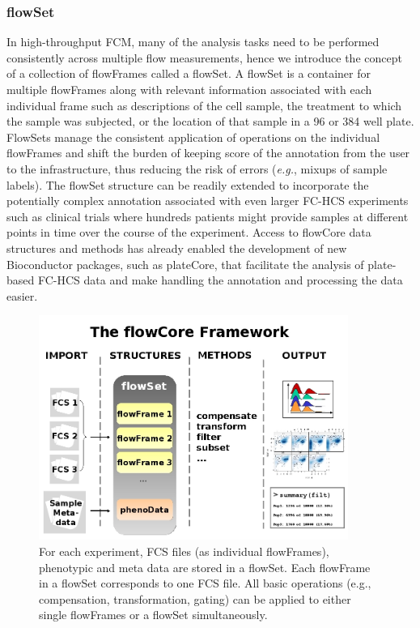 \documentclass[12pt]{article}
\begin{document}
\subsubsection*{flowSet}
In high-throughput FCM, many of the analysis tasks need to be
performed consistently across multiple flow measurements, hence we
introduce the concept of a collection of flowFrames called a
flowSet. A flowSet is a container for multiple flowFrames along with
relevant information associated with each individual frame such as
descriptions of the cell sample, the treatment to which the sample was
subjected, or the location of that sample in a 96 or 384 well plate.
FlowSets manage the consistent application of operations on the
individual flowFrames and shift the burden of keeping score of the
annotation from the user to the infrastructure, thus reducing the risk
of errors (\textit{e.g.}, mixups of sample labels). The flowSet
structure can be readily extended to incorporate the potentially
complex annotation associated with even larger FC-HCS experiments such
as clinical trials where hundreds patients might provide samples at
different points in time over the course of the experiment.  Access to
flowCore data structures and methods has already enabled the
development of new Bioconductor packages, such as plateCore, that
facilitate the analysis of plate-based FC-HCS data and make handling
the annotation and processing the data easier.


\begin{figure}
\centering
\includegraphics[width=0.9\textwidth]{Figure1-flowCoreFrameWork.jpg}
\caption{\label{fig1:FrameWork}{For each experiment, FCS files (as
    individual flowFrames), phenotypic and meta data are stored in a
    flowSet. Each flowFrame in a flowSet corresponds to one FCS
    file. All basic operations (e.g., compensation, transformation,
    gating) can be applied to either single flowFrames or a flowSet
    simultaneously.}}
\end{figure}
\end{document}
